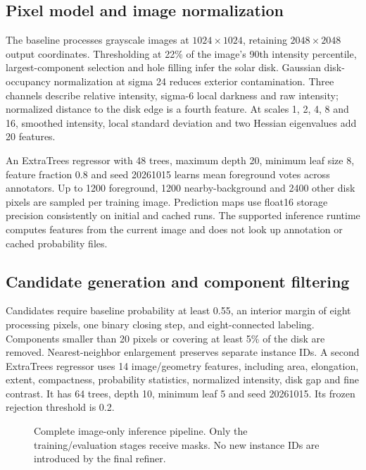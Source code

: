 \documentclass[sigconf]{acmart}
\begin{document}
\subsection{Pixel model and image normalization}
The baseline processes grayscale images at $1024\times1024$, retaining $2048\times2048$ output coordinates. Thresholding at 22\% of the image's 90th intensity percentile, largest-component selection and hole filling infer the solar disk. Gaussian disk-occupancy normalization at sigma 24 reduces exterior contamination. Three channels describe relative intensity, sigma-6 local darkness and raw intensity; normalized distance to the disk edge is a fourth feature. At scales 1, 2, 4, 8 and 16, smoothed intensity, local standard deviation and two Hessian eigenvalues add 20 features.

An ExtraTrees regressor with 48 trees, maximum depth 20, minimum leaf size 8, feature fraction 0.8 and seed 20261015 learns mean foreground votes across annotators. Up to 1200 foreground, 1200 nearby-background and 2400 other disk pixels are sampled per training image. Prediction maps use float16 storage precision consistently on initial and cached runs. The supported inference runtime computes features from the current image and does not look up annotation or cached probability files.
\subsection{Candidate generation and component filtering}
Candidates require baseline probability at least 0.55, an interior margin of eight processing pixels, one binary closing step, and eight-connected labeling. Components smaller than 20 pixels or covering at least 5\% of the disk are removed. Nearest-neighbor enlargement preserves separate instance IDs. A second ExtraTrees regressor uses 14 image/geometry features, including area, elongation, extent, compactness, probability statistics, normalized intensity, disk gap and fine contrast. It has 64 trees, depth 10, minimum leaf 5 and seed 20261015. Its frozen rejection threshold is 0.2.
\begin{figure}[b]\centering
{}
\caption{Complete image-only inference pipeline. Only the training/evaluation stages receive masks. No new instance IDs are introduced by the final refiner.}\label{fig:pipeline}
\end{figure}
\end{document}
